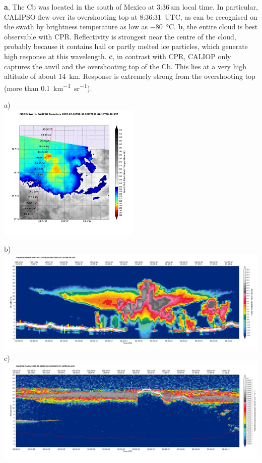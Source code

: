 \noindent
\begin{minipage}[t]{78mm}
\textbf{a}, The Cb was located in the south of
Mexico at 3:36\,am
local time. In particular, CALIPSO flew over its overshooting top at 8:36:31~UTC,
as can be recognised on the swath by brightness temperature as low as
\SI{-80}{\celsius}. \textbf{b},
the entire cloud is best observable with CPR. Reflectivity is strongest near the
centre of the cloud, probably because it contains hail or partly melted ice
particles, which generate high response at this wavelength. \textbf{c}, in
contrast with
CPR, CALIOP only captures the anvil and the overshooting top of the Cb. This
lies at a very high altitude of about \SI{14}{km}. Response is extremely strong
from
the overshooting top (more than \SI{0.1}{km^{-1} sr^{-1}}). 
\end{minipage}\hfill
\begin{minipage}[t]{68mm}
\noindent\textsf{\small a)}\\
\includegraphics[width=68mm,clip,trim=10mm 10mm 4mm 4mm]{images/overshooting-top/orbit-modis_x31+calipso.pdf}\\
\end{minipage}
\vspace{5mm}

\noindent\textsf{\small b)}\\
\includegraphics[width=150mm,clip,trim=10mm 10mm 4mm 4mm]{images/overshooting-top/1cloudsat-reflec.pdf}\\
\noindent\textsf{\small c)}\\
\includegraphics[width=150mm,clip,trim=10mm 10mm 4mm 4mm]{images/overshooting-top/1calipso532.pdf}

